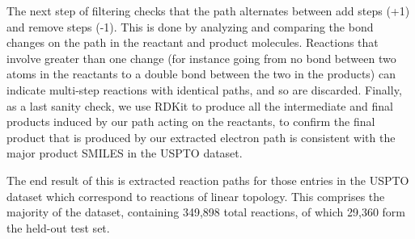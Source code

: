 The next step of filtering checks that the path alternates between add steps (+1) and remove steps (-1). 
This is done by analyzing and comparing the bond changes on the path in the reactant and product molecules. 
Reactions that involve greater than one change (for instance going from no bond between two atoms in the reactants to a double bond between the two in the products) can indicate multi-step 
reactions with identical paths, and so are discarded.
Finally, as a last sanity check, we use RDKit to produce all the intermediate and final products induced by our path acting on the reactants,
to confirm the final product that is produced by our extracted electron path is consistent with the major product SMILES in the USPTO dataset.

The end result of this is extracted reaction paths for those entries in the USPTO dataset which 
correspond to reactions of linear topology.
This comprises the majority of the dataset, containing 349,898 total reactions, of which 29,360 form the held-out test set.


